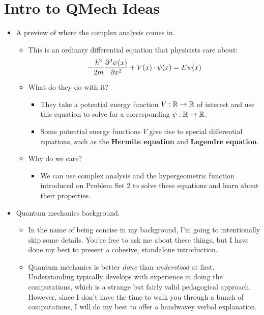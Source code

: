 \documentclass[../finalProject.tex]{subfiles}
\begin{document}
\section*{Intro to QMech Ideas}
\begin{itemize}
    \item A preview of where the complex analysis comes in.
    \begin{itemize}
        \item This is an ordinary differential equation that physicists care about:
        \begin{equation*}
            -\frac{\hbar^2}{2m}\pdv[2]{\psi(x)}{x}+V(x)\cdot\psi(x) = E\psi(x)
        \end{equation*}
        \item What do they do with it?
        \begin{itemize}
            \item They take a potential energy function $V:\mathbb{R}\to\mathbb{R}$ of interest and use this equation to solve for a corresponding $\psi:\mathbb{R}\to\mathbb{R}$.
            \item Some potential energy functions $V$ give rise to special differential equations, such as the \textbf{Hermite equation} and \textbf{Legendre equation}.
        \end{itemize}
        \item Why do we care?
        \begin{itemize}
            \item We can use complex analysis and the hypergeometric function introduced on Problem Set 2 to solve these equations and learn about their properties.
        \end{itemize}
    \end{itemize}
    \item Quantum mechanics background.
    \begin{itemize}
        \item In the name of being concise in my background, I'm going to intentionally skip some details. You're free to ask me about these things, but I have done my best to present a cohesive, standalone introduction.
        \item Quantum mechanics is better \emph{done} than \emph{understood} at first. Understanding typically develops with experience in doing the computations, which is a strange but fairly valid pedagogical approach. However, since I don't have the time to walk you through a bunch of computations, I will do my best to offer a handwavey verbal explanation.

\end{itemize}
\end{itemize}
\end{document}
